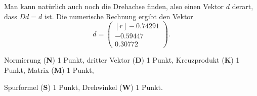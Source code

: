 \begin{diskussion}
Man kann natürlich auch noch die Drehachse finden, also einen Vektor
$d$ derart, dass $Dd=d$ ist.
Die numerische Rechnung ergibt den Vektor
\[
d=\begin{pmatrix*}[r]
  -0.74291\\
  -0.59447\\
   0.30772
\end{pmatrix*}.
\]
\end{diskussion}

\begin{bewertung}
\begin{teilaufgaben}
\item
Normierung ({\bf N}) 1 Punkt,
dritter Vektor ({\bf D}) 1 Punkt,
Kreuzprodukt ({\bf K}) 1 Punkt,
Matrix ({\bf M}) 1 Punkt,
\item
Spurformel ({\bf S}) 1 Punkt,
Drehwinkel ({\bf W}) 1 Punkt.
\end{teilaufgaben}
\end{bewertung}





